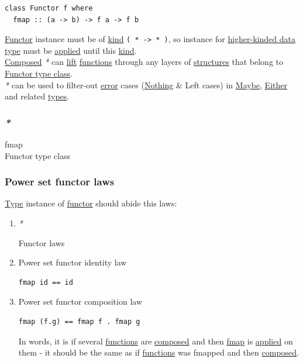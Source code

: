 \documentclass[a4paper,14pt,oneside]{book}
\begin{document}
\begin{verbatim}
class Functor f where
  fmap :: (a -> b) -> f a -> f b
\end{verbatim}

\hyperref[org4ae20fc]{Functor} instance must be of \hyperref[orgfd91f52]{kind} \texttt{( * -> * )}, so instance for \hyperref[orgc498dad]{higher-kinded data type} must be \hyperref[org008dd98]{applied} until this \hyperref[orgfd91f52]{kind}.\\

\hyperref[org7f1f5e3]{Composed} \emph{*} can \hyperref[org58dc979]{lift} \hyperref[orgcfd72f2]{functions} through any layers of \hyperref[org7fa289b]{structures} that belong to \hyperref[org112d285]{Functor type class}.\\

\emph{*} can be used to filter-out \hyperref[org5349b6a]{error} cases (\hyperref[org5d7f8ef]{Nothing} \& Left cases) in \hyperref[orgac818a3]{Maybe}, \hyperref[org4115ef3]{Either} and related \hyperref[org430d788]{types}.\\

\subsubsection{\emph{*}}
\label{sec:org91a6510}

\label{org52090d5}fmap\\
\label{org112d285}Functor type class\\

\subsubsection{\label{org41dd608}Power set functor laws}
\label{sec:orge18e741}
\hyperref[orgdbcea73]{Type} instance of \hyperref[org4ae20fc]{functor} should abide this laws:\\

\begin{enumerate}
\item \emph{*}
\label{sec:org734b23b}

\label{orga2db786}Functor laws\\

\item \label{orgc8571f9}Power set functor identity law
\label{sec:orgace27b4}
\begin{verbatim}
fmap id == id
\end{verbatim}

\item \label{orgbe7da20}Power set functor composition law
\label{sec:org38d17a1}
\begin{verbatim}
fmap (f.g) == fmap f . fmap g
\end{verbatim}
In words, it is if several \hyperref[orgcfd72f2]{functions} are \hyperref[org7f1f5e3]{composed} and then \hyperref[org52090d5]{fmap} is \hyperref[org008dd98]{applied} on them - it should be the same as if \hyperref[orgcfd72f2]{functions} was fmapped and then \hyperref[org7f1f5e3]{composed}.\\
\end{enumerate}
\end{document}
